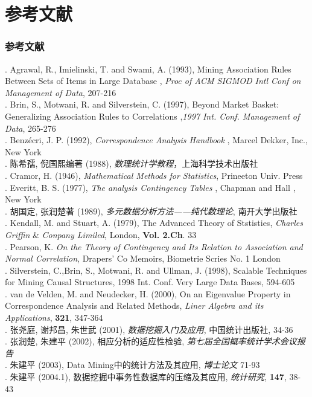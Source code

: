 \section{参考文献}
\begin{frame}\frametitle{参考文献}

\liuhao
 \indent[1]. Agrawal, R., Imielinski, T. and Swami, A. (1993), Mining Association Rules Between Sets of Items in Large Database , {\it Proc of ACM SIGMOD Intl Conf on Management of Data}, 207-216\\
\indent[2]. Brin, S., Motwani, R. and Silverstein, C. (1997), Beyond Market Basket: Generalizing Association Rules to Correlations ,{\it 1997 Int. Conf. Management of Data}, 265-276\\
\indent[3]. Benz\'{e}cri, J. P. (1992), {\it Correspondence Analysis Handbook} , Marcel Dekker, Inc., New York\\
\indent[4]. 陈希孺, 倪国熙编著 (1988), {\it 数理统计学教程}，上海科学技术出版社 \\
\indent[5]. Cramor, H. (1946), {\it Mathematical Methods for Statistics}, Prineeton Univ. Press\\
\indent[6]. Everitt, B. S. (1977), {\it The analysis Contingency Tables} , Chapman and Hall , New York\\
\indent[7]. 胡国定, 张润楚著 (1989), {\it 多元数据分析方法——纯代数理论}, 南开大学出版社 \\
\indent[8]. Kendall, M. and Stuart, A. (1979), The Advanced Theory of Ststisties,  {\it Charles Griffin} \& {\it Conpany Limiled}, London, {\bf Vol. 2.Ch}. 33\\
\indent[9]. Pearson, K. {\it On the Theory of Contingency and Its Relation to Association and Normal Correlation}, Drapers' Co Memoirs, Biometrie Scries No. 1 London\\
\indent[10]. Silverstein, C.,Brin, S., Motwani, R. and Ullman, J. (1998), Scalable Techniques for Mining Causal Structures, 1998 Int. Conf. Very Large Data Bases, 594-605\\
\indent[11]. van de Velden, M. and Neudecker, H. (2000), On an Eigenvalue Property in Correspondence Analysis and Related Methods, {\it Liner Algebra and its Applications}, {\bf321}, 347-364\\
\indent[12]. 张尧庭, 谢邦昌, 朱世武 (2001), {\it  数据挖掘入门及应用}, 中国统计出版社, 34-36\\
\indent[13]. 张润楚, 朱建平 (2002), 相应分析的适应性检验, {\it 第七届全国概率统计学术会议报告}\\
\indent[14]. 朱建平 (2003), Data Mining中的统计方法及其应用, {\it 博士论文} 71-93\\
\indent[15]. 朱建平 (2004.1), 数据挖掘中事务性数据库的压缩及其应用, {\it 统计研究}, {\bf 147}, 38-43\\


\end{frame}

